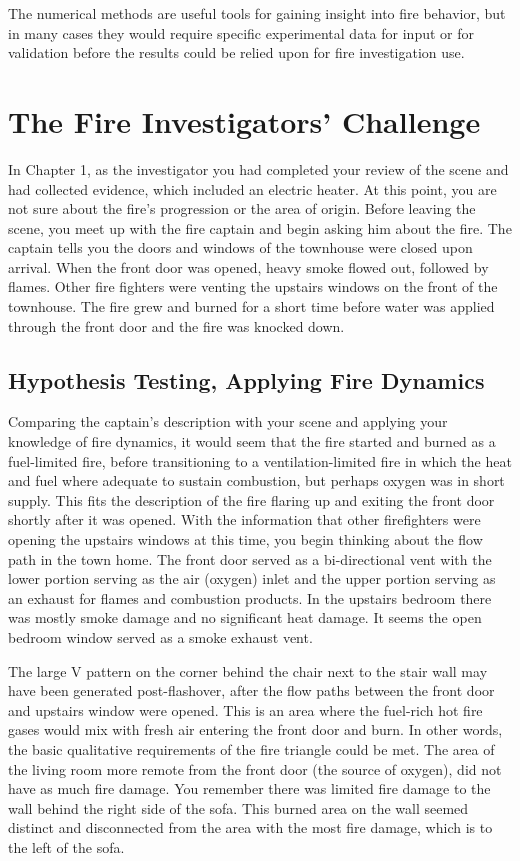 \documentclass[twoside]{uocthesis}
\begin{document}
{The numerical methods are useful tools for gaining insight into fire behavior, but in many cases they would require specific experimental data for input or for validation before the results could be relied upon for fire investigation use.

\section{The Fire Investigators' Challenge}

In Chapter 1, as the investigator you had completed your review of the scene and had collected evidence, which included an electric heater.  At this point, you are not sure about the fire's progression or the area of origin.  Before leaving the scene, you meet up with the fire captain and begin asking him about the fire.  The captain tells you the doors and windows of the townhouse were closed upon arrival.  When the front door was opened, heavy smoke flowed out, followed by flames.  Other fire fighters were venting the upstairs windows on the front of the townhouse.  The fire grew and burned for a short time before water was applied through the front door and the fire was knocked down.

\subsection{Hypothesis Testing, Applying Fire Dynamics}

Comparing the captain's description with your scene and applying your knowledge of fire dynamics, it would seem that the fire started and burned as a fuel-limited fire, before transitioning to a ventilation-limited fire in which the heat and fuel where adequate to sustain combustion, but perhaps oxygen was in short supply.  This fits the description of the fire flaring up and exiting the front door shortly after it was opened.  With the information that other firefighters were opening the upstairs windows at this time, you begin thinking about the flow path in the town home.  The front door served as a bi-directional vent with the lower portion serving as the air (oxygen) inlet and the upper portion serving as an exhaust for flames and combustion products.  In the upstairs bedroom there was mostly smoke damage and no significant heat damage. It seems the open bedroom window served as a smoke exhaust vent.         

The large V pattern on the corner behind the chair next to the stair wall may have been generated post-flashover, after the flow paths between the front door and upstairs window were opened. This is an area where the fuel-rich hot fire gases would mix with fresh air entering the front door and burn. In other words, the basic qualitative requirements of the fire triangle could be met.  The area of the living room more remote from the front door (the source of oxygen), did not have as much fire damage.  You remember there was limited fire damage to the wall behind the right side of the sofa.  This burned area on the wall seemed distinct and disconnected from the area with the most fire damage, which is to the left of the sofa.  

}
\end{document}
